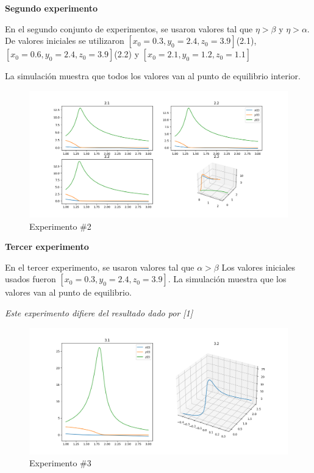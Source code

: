 \documentclass{wscpaperproc}
\theoremstyle{wsc}
\begin{document}
\vspace*{7cm}
{\bf Segundo experimento}

En el segundo conjunto de experimentos, se usaron valores tal que $\eta > \beta$ y $\eta > \alpha$.
De valores iniciales se utilizaron $[x_0=0.3, y_0=2.4, z_0=3.9]$(2.1),
$[x_0=0.6, y_0=2.4, z_0=3.9]$(2.2) y $[x_0=2.1, y_0=1.2, z_0=1.1]$

La simulación muestra que todos los valores van al punto de equilibrio interior.

\begin{figure}[h!]
	\includegraphics[width=\linewidth]{./images/2.png}
	\caption{Experimento \#2}
\end{figure}

\vspace*{4cm}
{\bf Tercer experimento}

En el tercer experimento, se usaron valores tal que $\alpha > \beta$
Los valores iniciales usados fueron $[x_0=0.3, y_0=2.4, z_0=3.9]$. La simulación muestra
que los valores van al punto de equilibrio.

{\it Este experimento difiere del resultado dado por [1]}

\begin{figure}[h!]
	\includegraphics[width=\linewidth]{./images/3.png}
	\caption{Experimento \#3}
\end{figure}
\end{document}
